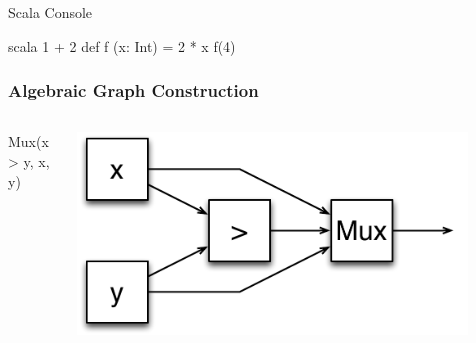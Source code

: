\documentclass[xcolor=pdflatex,dvipsnames,table]{beamer}
\begin{document}
\begin{frame}[fragile]{Scala Console}
\begin{scala}
scala
1 + 2
def f (x: Int) = 2 * x
f(4)
\end{scala}
\end{frame}

\begin{frame}[fragile]
\frametitle{Algebraic Graph Construction}

\begin{columns}
{
\begin{scala}
Mux(x > y, x, y)
\end{scala}
}


\begin{center}
\includegraphics[width=0.9\textwidth]{figs/max2.pdf} 
\end{center}
\end{columns}
\end{frame}
\end{document}
